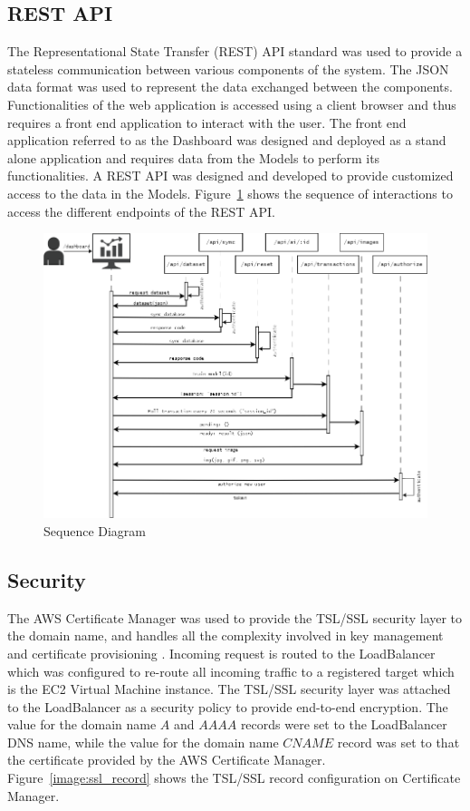 \subsection{REST API}
The Representational State Transfer (REST) API standard was used to provide a stateless communication between various components of the system. 
The JSON data format was used to represent the data exchanged between the components. Functionalities of the web application is accessed using a 
client browser and thus requires a front end application to interact with the user. The front end application referred to as the Dashboard was
designed and deployed as a stand alone application and requires data from the Models to perform its functionalities. A REST API was designed and 
developed to provide customized access to the data in the Models. 
Figure~\ref{image:seq_diagram} shows the sequence of interactions to access the different endpoints of the REST API. 

\begin{figure}[h!]
    \includegraphics[width=1.0\textwidth]{images/seq_diagram.png}
    \caption{Sequence Diagram}
    \label{image:seq_diagram}
\end{figure}


\subsection{Security}
The AWS Certificate Manager was used to provide the TSL/SSL security layer to the domain name, and handles all the complexity involved in 
key management and certificate provisioning \cite{aws_acm}. Incoming request is routed to the LoadBalancer which was configured to re-route all incoming traffic 
to a registered target which is the EC2 Virtual Machine instance. The TSL/SSL security layer was attached to the LoadBalancer as a security policy 
to provide end-to-end encryption. The value for the domain name $A$ and $AAAA$ records were set to the LoadBalancer DNS name, while the value 
for the domain name $CNAME$ record was set to that the certificate provided by the AWS Certificate Manager. 
Figure~\ref{image:ssl_record} shows the TSL/SSL record configuration on Certificate Manager. 

